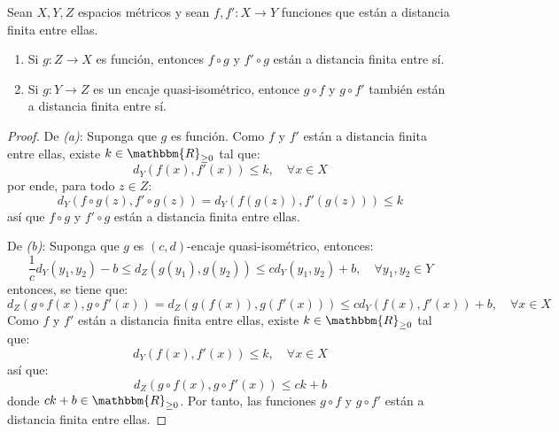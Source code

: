 \documentclass[12pt]{report}
\newcounter{it}
\theoremstyle{largebreak}
\newcommand\cf[3]{\ensuremath{#1:#2\rightarrow#3}}
\newcommand{\bbm}[1]{\ensuremath{\mathbbm{#1}}}
\begin{document}
    \begin{excer}
        Sean $X,Y,Z$ espacios métricos y sean $\cf{f,f'}{X}{Y}$ funciones que están a distancia finita entre ellas.
        \begin{enumerate}[label = \textit{(\alph*)}]
            \item Si $\cf{g}{Z}{X}$ es función, entonces $f\circ g$ y $f'\circ g$ están a distancia finita entre sí.
            \item Si $\cf{g}{Y}{Z}$ es un encaje quasi-isométrico, entonce $g\circ f$ y $g\circ f'$ también están a distancia finita entre sí.
        \end{enumerate}
    \end{excer}

    \begin{proof}
        De \textit{(a)}: Suponga que $g$ es función. Como $f$ y $f'$ están a distancia finita entre ellas, existe $k\in\bbm{R}_{\geq0}$ tal que:
        \begin{equation*}
            d_Y(f(x),f'(x))\leq k,\quad\forall x\in X
        \end{equation*}
        por ende, para todo $z\in Z$:
        \begin{equation*}
            d_Y(f\circ g(z),f'\circ g(z))=d_Y(f(g(z)),f'(g(z)))\leq k
        \end{equation*}
        así que $f\circ g$ y $f'\circ g$ están a distancia finita entre ellas.

        De \textit{(b)}: Suponga que $g$ es $(c,d)$-encaje quasi-isométrico, entonces:
        \begin{equation*}
            \frac{1}{c}d_Y(y_1,y_2)-b\leq d_Z(g(y_1),g(y_2))\leq cd_Y(y_1,y_2)+b,\quad\forall y_1,y_2\in Y
        \end{equation*}
        entonces, se tiene que:
        \begin{equation*}
            d_Z(g\circ f(x),g\circ f'(x))=d_Z(g(f(x)),g(f'(x)))\leq cd_Y(f(x),f'(x))+b,\quad\forall x\in X
        \end{equation*}
        Como $f$ y $f'$ están a distancia finita entre ellas, existe $k\in\bbm{R}_{\geq0}$ tal que:
        \begin{equation*}
            d_Y(f(x),f'(x))\leq k,\quad\forall x\in X
        \end{equation*}
        así que:
        \begin{equation*}
            d_Z(g\circ f(x),g\circ f'(x))\leq ck+b
        \end{equation*}
        donde $ck+b\in\bbm{R}_{\geq0}$. Por tanto, las funciones $g\circ f$ y $g\circ f'$ están a distancia finita entre ellas.
    \end{proof}
\end{document}

